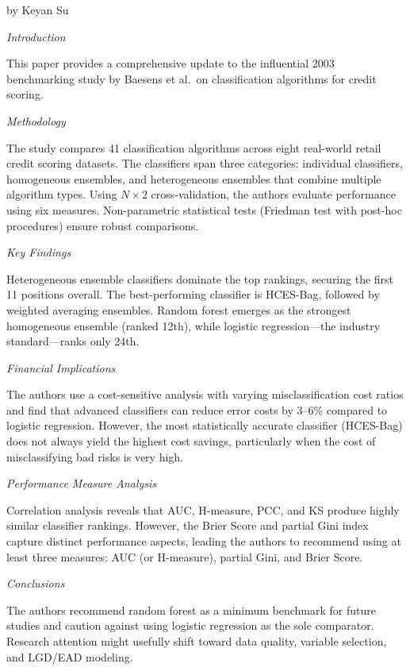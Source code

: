 \documentclass[letterpaper]{article}
\begin{document}
	{\color{deepred} by Keyan Su}
	
	
	\textit{Introduction}
	
	This paper provides a comprehensive update to the influential 2003 benchmarking study by Baesens et al.\ on classification algorithms for credit scoring.
	
	\medskip
	
	\textit{Methodology}
	
	The study compares 41 classification algorithms across eight real-world retail credit scoring datasets. The classifiers span three categories: individual classifiers, homogeneous ensembles, and heterogeneous ensembles that combine multiple algorithm types. Using $N\times 2$ cross-validation, the authors evaluate performance using six measures. Non-parametric statistical tests (Friedman test with post-hoc procedures) ensure robust comparisons.
	
	\medskip
	
	\textit{Key Findings}
	
	Heterogeneous ensemble classifiers dominate the top rankings, securing the first 11 positions overall. The best-performing classifier is HCES-Bag, followed by weighted averaging ensembles. Random forest emerges as the strongest homogeneous ensemble (ranked 12th), while logistic regression---the industry standard---ranks only 24th.
	
	\medskip
	
	\textit{Financial Implications}
	
	The authors use a cost-sensitive analysis with varying misclassification cost ratios and find that advanced classifiers can reduce error costs by 3--6\% compared to logistic regression. However, the most statistically accurate classifier (HCES-Bag) does not always yield the highest cost savings, particularly when the cost of misclassifying bad risks is very high.
	
	\medskip
	
	\textit{Performance Measure Analysis}
	
	Correlation analysis reveals that AUC, H-measure, PCC, and KS produce highly similar classifier rankings. However, the Brier Score and partial Gini index capture distinct performance aspects, leading the authors to recommend using at least three measures: AUC (or H-measure), partial Gini, and Brier Score.
	
	\medskip
	
	\textit{Conclusions}
	
	The authors recommend random forest as a minimum benchmark for future studies and caution against using logistic regression as the sole comparator. Research attention might usefully shift toward data quality, variable selection, and LGD/EAD modeling.
	
\end{document}
